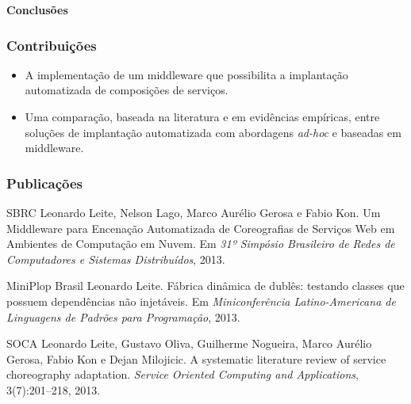 \documentclass{beamer}
\newcommand\adhoc{\emph{ad-hoc}\xspace}
\newcommand\sectiontitle[1]{\begin{center}\huge\textbf{#1}\end{center}}
\begin{document}
\begin{frame}

\sectiontitle{Conclusões}

\end{frame}



\begin{frame}
\frametitle{Contribuições}

\begin{itemize}
\item A implementação de um middleware que possibilita a implantação automatizada de composições de serviços. 
\item Uma comparação, baseada na literatura e em evidências empíricas, entre soluções de implantação automatizada com abordagens \adhoc e baseadas em middleware.
\end{itemize}

\end{frame}



\begin{frame}
\frametitle{Publicações}

{\small
\begin{block}{SBRC}
Leonardo Leite, Nelson Lago, Marco Aurélio Gerosa e Fabio Kon. Um Middleware para Encenação Automatizada de Coreografias de Serviços Web em Ambientes de Computação em Nuvem. Em \emph{31º Simpósio Brasileiro de Redes de Computadores e Sistemas Distribuídos}, 2013.
\end{block}

\begin{block}{MiniPlop Brasil}
Leonardo Leite. Fábrica dinâmica de dublês: testando classes que possuem dependências não injetáveis. Em \emph{Miniconferência Latino-Americana de Linguagens de Padrões para Programação}, 2013.
\end{block}

\begin{block}{SOCA}
Leonardo Leite, Gustavo Oliva, Guilherme Nogueira, Marco Aurélio Gerosa, Fabio Kon e Dejan Milojicic. A systematic literature review of service choreography adaptation. \emph{Service Oriented Computing and Applications}, 3(7):201--218, 2013.
\end{block}
}

\end{frame}

\end{document}
